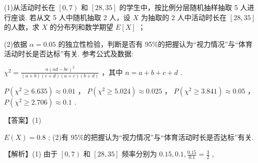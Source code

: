 \documentclass[10pt]{article}
\newcommand*\circled[1]{\tikz[baseline=(char.base)]{\node[shape=circle,draw,inner sep=1.5pt] (char) {\small #1};}}
\begin{document}
\begin{center}
\end{center}

(1)从活动时长在 \(\left\lbrack  {0,7}\right)\) 和 \(\left\lbrack  {{28},{35}}\right\rbrack\) 的学生中，按比例分层随机抽样抽取 5 人进行座谈. 若从文 5 人中随机抽取 2 人，设 \(X\) 为抽取的 2 人中活动时长在 \(\left\lbrack  {{28},{35}}\right\rbrack\) 的人数，求 \(X\) 的分布列和数学期望 \(E\left\lbrack  X\right\rbrack\) ；

(2)依据 \(\alpha  = {0.05}\) 的独立性检验，判断是否有 95\%的把握认为“视力情况”与“体育活动时长是否达标”有关. 参考公式及数据:

 \circled{1}  \({\chi }^{2} = \frac{n{\left( ad - bc\right) }^{2}}{\left( {a + b}\right) \left( {c + d}\right) \left( {a + c}\right) \left( {b + d}\right) }\) ，其中 \(n = a + b + c + d\) .

 \circled{2}  \(P\left( {{\chi }^{2} \geq  {6.635}}\right)  \approx  {0.01}\) ， \(P\left( {{\chi }^{2} \geq  {5.024}}\right)  \approx  {0.025}\) ， \(P\left( {{\chi }^{2} \geq  {3.841}}\right)  \approx  {0.05}\) ， \(P\left( {{\chi }^{2} \geq  {2.706}}\right)  \approx  {0.1}\) .

【答案】(1)

\begin{center}
\end{center}

\(E\left( X\right)  = {0.8}\) ; (2)有 95\%的把握认为“视力情况”与“体育活动时长是否达标”有关.

【解析】(1) 由于 \(\left\lbrack  {0,7}\right)\) 和 \(\left\lbrack  {{28},{35}}\right\rbrack\) 频率分别为 \({0.15},{0.1},\frac{0.15}{0.1} = \frac{3}{2}\) ,
\end{document}
